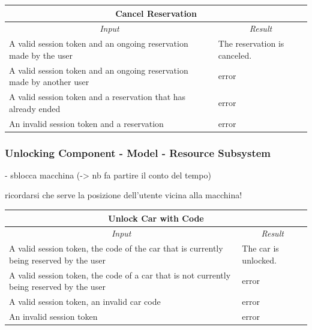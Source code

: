 \documentclass[english]{article}
\begin{document}
\begin{center}

	\begin{tabular}{ | p{6cm} | p{6cm} | }
		\hline 
		\multicolumn{2}{|c|}{\textbf{Cancel Reservation}} \\
		\hline
		\multicolumn{1}{|c|}{\textit{Input}} & \multicolumn{1}{c|}{\textit{Result}} \\
		\hline
		A valid session token and an ongoing reservation made by the user & The reservation is canceled. \\
		\hline
		A valid session token and an ongoing reservation made by another user & error \\
		\hline
		A valid session token and a reservation that has already ended & error \\
		\hline
		An invalid session token and a reservation & error \\
		\hline
	\end{tabular}
\end{center}

\subsubsection{Unlocking Component - Model - Resource Subsystem}
- sblocca macchina (-> nb fa partire il conto del tempo)

ricordarsi che serve la posizione dell'utente vicina alla macchina!

\begin{center}

	\begin{tabular}{ | p{6cm} | p{6cm} | }
		\hline 
		\multicolumn{2}{|c|}{\textbf{Unlock Car with Code}} \\
		\hline
		\multicolumn{1}{|c|}{\textit{Input}} & \multicolumn{1}{c|}{\textit{Result}} \\
		\hline
		A valid session token, the code of the car that is currently being reserved by the user & The car is unlocked. \\
		\hline
		A valid session token, the code of a car that is not currently being reserved by the user & error \\
		\hline
		A valid session token, an invalid car code & error \\
		\hline
		An invalid session token & error \\
		\hline
	\end{tabular}
\end{center}
\end{document}
